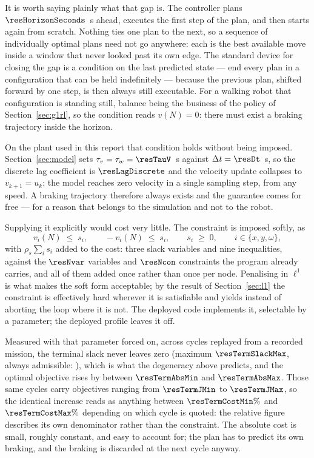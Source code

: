 \documentclass[11pt,a4paper]{article}
\begin{document}
It is worth saying plainly what that gap is. The controller plans $\resHorizonSeconds$~s ahead, executes the
first step of the plan, and then starts again from scratch. Nothing ties one plan to the next, so a sequence
of individually optimal plans need not go anywhere: each is the best available move inside a window that
never looked past its own edge. The standard device for closing the gap is a condition on the last predicted
state --- end every plan in a configuration that can be held indefinitely --- because the previous plan,
shifted forward by one step, is then always still executable. For a walking robot that configuration is
standing still, balance being the business of the policy of Section~\ref{sec:g1rl}, so the condition reads
$v(N)=0$: there must exist a braking trajectory inside the horizon.

On the plant used in this report that condition holds without being imposed. Section~\ref{sec:model} sets
$\tau_v=\tau_w=\resTauV$~s against $\Delta t=\resDt$~s, so the discrete lag coefficient is $\resLagDiscrete$
and the velocity update collapses to $v_{k+1}=u_k$: the model reaches zero velocity in a single sampling
step, from any speed. A braking trajectory therefore always exists and the guarantee comes for free --- for
a reason that belongs to the simulation and not to the robot.

Supplying it explicitly would cost very little. The constraint is imposed softly, as
\begin{equation}
  v_i(N)\;\le\;s_i,\qquad -v_i(N)\;\le\;s_i,\qquad s_i\;\ge\;0,\qquad i\in\{x,y,\omega\},
  \label{eq:terminal}
\end{equation}
with $\rho_s\sum_i s_i$ added to the cost: three slack variables and nine inequalities, against the
$\resNvar$ variables and $\resNcon$ constraints the program already carries, and all of them added once
rather than once per node. Penalising in $\ell^1$ is what makes the soft form acceptable; by the result
of Section~\ref{sec:l1} the constraint is effectively hard wherever it is satisfiable and yields instead of
aborting the loop where it is not. The deployed code implements it, selectable by a parameter; the deployed
profile leaves it off.

Measured with that parameter forced on, across cycles replayed from a recorded mission, the terminal slack
never leaves zero (maximum $\resTermSlackMax$, always admissible: \resTermFeasible), which is what the
degeneracy above predicts, and the optimal objective rises by between $\resTermAbsMin$ and $\resTermAbsMax$.
Those same cycles carry objectives ranging from $\resTermJMin$ to $\resTermJMax$, so the identical increase
reads as anything between $\resTermCostMin\%$ and $\resTermCostMax\%$ depending on which cycle is quoted:
the relative figure describes its own denominator rather than the constraint. The absolute cost is small,
roughly constant, and easy to account for; the plan has to predict its own braking, and the braking is
discarded at the next cycle anyway.
\end{document}
